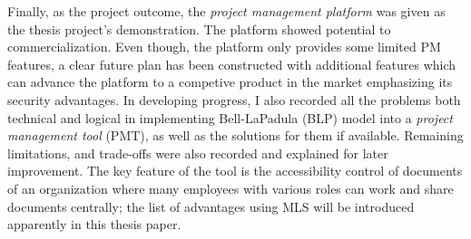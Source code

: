 Finally, as the project outcome, the \emph{project management platform} was given as the thesis project's demonstration.
The platform showed potential to commercialization.
Even though, the platform only provides some limited PM features, a clear future plan has been constructed with additional features which can advance the platform to a competive product in the market emphasizing its security advantages.
In developing progress, I also recorded all the problems both technical and logical in implementing Bell-LaPadula (BLP) model into a \emph{project management tool} (PMT), as well as the solutions for them if available.
Remaining limitations, and trade-offs were also recorded and explained for later improvement.
The key feature of the tool is the accessibility control of documents of an organization where many employees with various roles can work and share documents centrally; the list of advantages using MLS will be introduced apparently in this thesis paper.

\endgroup			

\vfill
